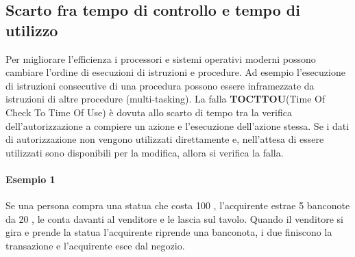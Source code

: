\subsection{Scarto fra tempo di controllo e tempo di utilizzo}
Per migliorare l'efficienza i processori e sistemi operativi moderni possono cambiare l'ordine di esecuzioni di istruzioni e procedure. Ad esempio l'esecuzione di istruzioni consecutive di una procedura possono essere inframezzate da istruzioni di altre procedure (multi-tasking).
\newline \newline
La falla \textbf{TOCTTOU}(Time Of Check To Time Of Use) è dovuta allo scarto di tempo tra la verifica dell'autorizzazione a compiere un azione e l'esecuzione dell'azione stessa. Se i dati di autorizzazione non vengono utilizzati direttamente e, nell'attesa di essere utilizzati sono disponibili per la modifica, allora si verifica la falla.
\paragraph{Esempio 1} 
Se una persona compra una statua che costa 100 \officialeuro, l'acquirente estrae 5 banconote da 20 \officialeuro, le conta davanti al venditore e le lascia sul tavolo. Quando il venditore si gira e prende la statua l'acquirente riprende una banconota, i due finiscono la transazione e l'acquirente esce dal negozio.


